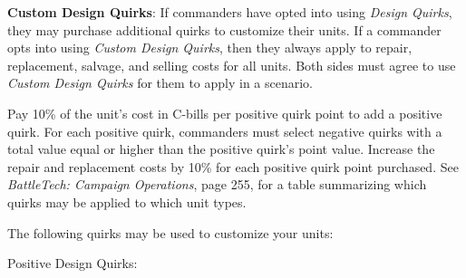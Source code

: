 \item {\bfseries Custom Design Quirks}: If commanders have opted into using \emph{Design Quirks}, they may purchase additional quirks to customize their units.
If a commander opts into using \emph{Custom Design Quirks}, then they always apply to repair, replacement, salvage, and selling costs for all units.
Both sides must agree to use \emph{Custom Design Quirks} for them to apply in a scenario.

Pay 10\% of the unit's cost in C-bills per positive quirk point to add a positive quirk.
For each positive quirk, commanders must select negative quirks with a total value equal or higher than the positive quirk's point value.
Increase the repair and replacement costs by 10\% for each positive quirk point purchased.
See \emph{BattleTech: Campaign Operations}, page 255, for a table summarizing which quirks may be applied to which unit types.

The following quirks may be used to customize your units:

Positive Design Quirks:
